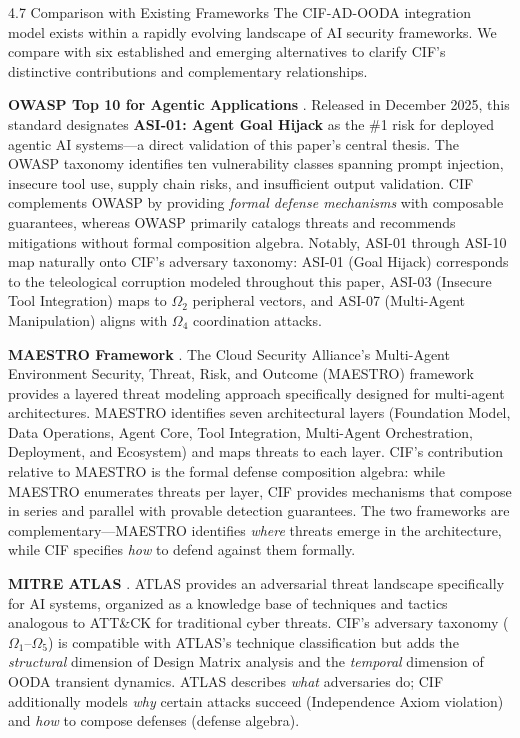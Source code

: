 \documentclass[
  ignorenonframetext,
]{beamer}
\begin{document}
\begin{frame}[allowframebreaks]{4.7 Comparison with Existing Frameworks}
\protect{}\label{comparison-with-existing-frameworks}
The CIF-AD-OODA integration model exists within a rapidly evolving
landscape of AI security frameworks. We compare with six established and
emerging alternatives to clarify CIF's distinctive contributions and
complementary relationships.

\textbf{OWASP Top 10 for Agentic Applications} \cite{owasp2025agentic}.
Released in December 2025, this standard designates \textbf{ASI-01:
Agent Goal Hijack} as the \#1 risk for deployed agentic AI systems---a
direct validation of this paper's central thesis. The OWASP taxonomy
identifies ten vulnerability classes spanning prompt injection, insecure
tool use, supply chain risks, and insufficient output validation. CIF
complements OWASP by providing \emph{formal defense mechanisms} with
composable guarantees, whereas OWASP primarily catalogs threats and
recommends mitigations without formal composition algebra. Notably,
ASI-01 through ASI-10 map naturally onto CIF's adversary taxonomy:
ASI-01 (Goal Hijack) corresponds to the teleological corruption modeled
throughout this paper, ASI-03 (Insecure Tool Integration) maps to
\(\Omega_2\) peripheral vectors, and ASI-07 (Multi-Agent Manipulation)
aligns with \(\Omega_4\) coordination attacks.

\textbf{MAESTRO Framework} \cite{csa2025maestro}. The Cloud Security
Alliance's Multi-Agent Environment Security, Threat, Risk, and Outcome
(MAESTRO) framework provides a layered threat modeling approach
specifically designed for multi-agent architectures. MAESTRO identifies
seven architectural layers (Foundation Model, Data Operations, Agent
Core, Tool Integration, Multi-Agent Orchestration, Deployment, and
Ecosystem) and maps threats to each layer. CIF's contribution relative
to MAESTRO is the formal defense composition algebra: while MAESTRO
enumerates threats per layer, CIF provides mechanisms that compose in
series and parallel with provable detection guarantees. The two
frameworks are complementary---MAESTRO identifies \emph{where} threats
emerge in the architecture, while CIF specifies \emph{how} to defend
against them formally.

\textbf{MITRE ATLAS} \cite{mitre2023atlas}. ATLAS provides an
adversarial threat landscape specifically for AI systems, organized as a
knowledge base of techniques and tactics analogous to ATT\&CK for
traditional cyber threats. CIF's adversary taxonomy
(\(\Omega_1\)--\(\Omega_5\)) is compatible with ATLAS's technique
classification but adds the \emph{structural} dimension of Design Matrix
analysis and the \emph{temporal} dimension of OODA transient dynamics.
ATLAS describes \emph{what} adversaries do; CIF additionally models
\emph{why} certain attacks succeed (Independence Axiom violation) and
\emph{how} to compose defenses (defense algebra).


\end{frame}
\end{document}
